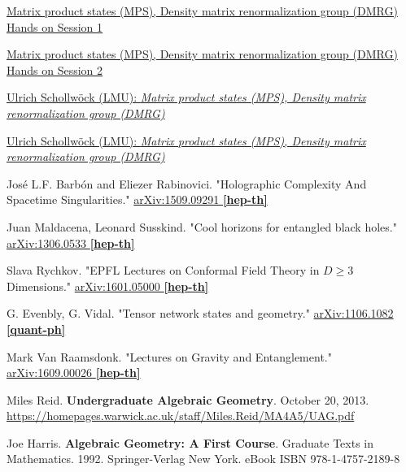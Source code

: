 \documentclass[10pt]{amsart}
\begin{document}
\begin{thebibliography}{9}
\href{https://cast.itunes.uni-muenchen.de/clips/uN8yxWC8m9/vod/high_quality.mp4}{Matrix product states (MPS), Density matrix renormalization group (DMRG) Hands on Session 1} 

\href{https://cast.itunes.uni-muenchen.de/clips/xJRe4DD7Fo/vod/high_quality.mp4}{Matrix product states (MPS), Density matrix renormalization group (DMRG) Hands on Session 2} 

\href{https://www.asc.physik.lmu.de/activities/schools/archiv/asc_school_17/extramaterial/schollwoeck_asc_1.pdf}{Ulrich Schollw\"{o}ck (LMU): \emph{Matrix product states (MPS), Density matrix renormalization group (DMRG)}}

\href{https://www.asc.physik.lmu.de/activities/schools/archiv/asc_school_17/extramaterial/schollwoeck_asc_2.pdf}{Ulrich Schollw\"{o}ck (LMU): \emph{Matrix product states (MPS), Density matrix renormalization group (DMRG)}}


Jos\'{e} L.F. Barb\'{o}n and Eliezer Rabinovici.  "Holographic Complexity And Spacetime Singularities."  \href{https://arxiv.org/abs/1509.09291v3}{arXiv:1509.09291 \textbf{[hep-th]}}

Juan Maldacena, Leonard Susskind.  "Cool horizons for entangled black holes."  \href{https://arxiv.org/abs/1306.0533}{ 	arXiv:1306.0533 \textbf{[hep-th]}}

Slava Rychkov.  "EPFL Lectures on Conformal Field Theory in $D \geq 3$ Dimensions."    \href{https://arxiv.org/abs/1601.05000}{arXiv:1601.05000 \textbf{[hep-th]}}

G. Evenbly, G. Vidal.  "Tensor network states and geometry."  \href{https://arxiv.org/abs/1106.1082}{arXiv:1106.1082 \textbf{[quant-ph]}}

Mark Van Raamsdonk.  "Lectures on Gravity and Entanglement."  \href{https://arxiv.org/abs/1609.00026}{arXiv:1609.00026 \textbf{[hep-th]}}


Miles Reid. \textbf{Undergraduate Algebraic Geometry}. October 20, 2013. \url{https://homepages.warwick.ac.uk/staff/Miles.Reid/MA4A5/UAG.pdf}

Joe Harris. \textbf{Algebraic Geometry: A First Course}. Graduate Texts in Mathematics. 1992. Springer-Verlag New York.   eBook ISBN 978-1-4757-2189-8
    




\end{thebibliography}
\end{document}
